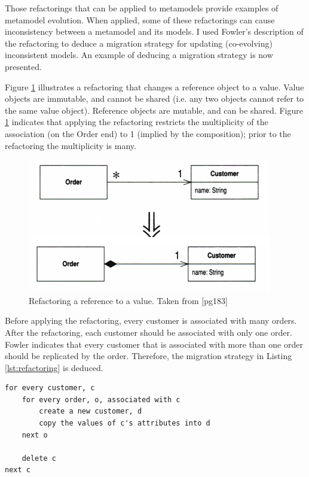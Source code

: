 Those refactorings that can be applied to metamodels provide examples of metamodel evolution. When applied, some of these refactorings can cause inconsistency between a metamodel and its models. I used Fowler's description of the refactoring to deduce a migration strategy for updating (co-evolving) inconsistent models. An example of deducing a migration strategy is now presented.

Figure \ref{fig:refactoring} illustrates a refactoring that changes a reference object to a value. Value objects are immutable, and cannot be shared (i.e. any two objects cannot refer to the same value object). Reference objects are mutable, and can be shared. Figure \ref{fig:refactoring} indicates that applying the refactoring restricts the multiplicity of the association (on the Order end) to 1 (implied by the composition); prior to the refactoring the multiplicity is many.

\begin{figure}[htbp]
  \begin{center}
    \leavevmode
    \includegraphics[scale=0.5]{refactoring.png}
  \end{center}
  \caption{Refactoring a reference to a value. Taken from \cite{fowler99refactoring}[pg183]}
  \label{fig:refactoring}
\end{figure}

Before applying the refactoring, every customer is associated with many orders. After the refactoring, each customer should be associated with only one order. Fowler indicates that every customer that is associated with more than one order should be replicated by the order. Therefore, the migration strategy in Listing \ref{lst:refactoring} is deduced.

\begin{lstlisting}[caption=Migration strategy for the above refactoring in pseudo code., label=lst:refactoring]
for every customer, c
	for every order, o, associated with c
		create a new customer, d
		copy the values of c's attributes into d
	next o
	
	delete c
next c
\end{lstlisting}

